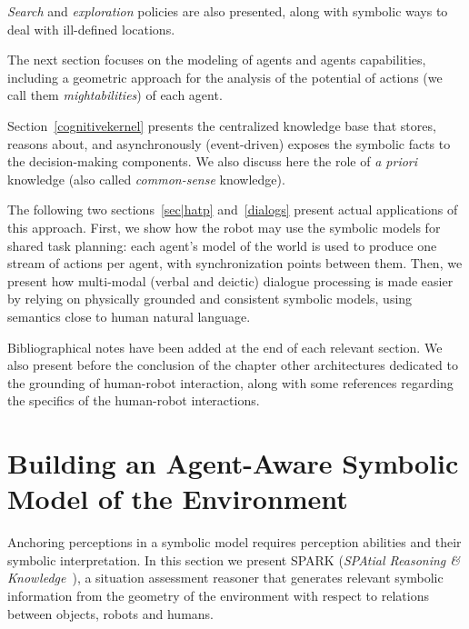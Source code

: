 \documentclass{svmult}
\begin{document}
\emph{Search} and \emph{exploration} policies are also presented, along with
symbolic ways to deal with ill-defined locations.

The next section focuses on the modeling of agents and agents capabilities,
including a geometric approach for the analysis of the potential of actions (we
call them \emph{mightabilities}) of each agent.

Section~\ref{cognitivekernel} presents the centralized knowledge base that
stores, reasons about, and asynchronously (event-driven) exposes the symbolic
facts to the decision-making components. We also discuss here the role of {\it
a priori} knowledge (also called \emph{common-sense} knowledge).

The following two sections~\ref{sec|hatp} and~\ref{dialogs} present actual
applications of this approach. First, we show how the robot may use the
symbolic models for shared task planning: each agent's model of the world is
used to produce one stream of actions per agent, with synchronization points
between them. Then, we present how multi-modal (verbal and deictic) dialogue
processing is made easier by relying on physically grounded and consistent
symbolic models, using semantics close to human natural language.

Bibliographical notes have been added at the end of each relevant section.  We
also present before the conclusion of the chapter other architectures dedicated
to the grounding of human-robot interaction, along with some references
regarding the specifics of the human-robot interactions.



\section{Building an Agent-Aware Symbolic Model of the Environment}
\label{sec:situ}

Anchoring perceptions in a symbolic model requires perception abilities and
their symbolic interpretation. In this section we present SPARK (\emph{SPAtial
Reasoning \& Knowledge}~\cite{Sisbot2011}), a situation assessment reasoner
that generates relevant symbolic information from the geometry of the
environment with respect to relations between objects, robots and humans.
\end{document}
